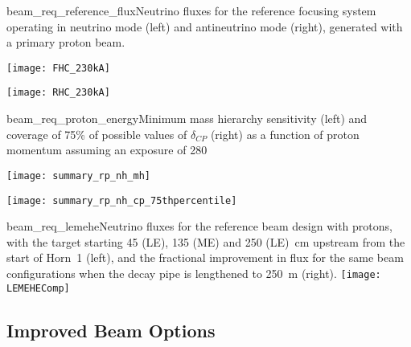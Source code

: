 \begin{cdrfigure}{beam_req_reference_flux}{Neutrino fluxes for the reference 
    focusing system operating in neutrino mode (left) and antineutrino 
    mode (right), generated with a  %
    primary proton beam.} 
\centering 
\begin{minipage}{0.45\textwidth}
\centering 
\texttt{[image: FHC\_230kA]}
\end{minipage}\hfill 
\begin{minipage}{0.45\textwidth}
\centering 
\texttt{[image: RHC\_230kA]}
\end{minipage}
\end{cdrfigure}

\begin{cdrfigure}{beam_req_proton_energy}{Minimum mass hierarchy
    sensitivity (left) and 
    coverage of 75\% of possible values of $\delta_{CP}$ (right) as a
    function of proton momentum assuming an exposure of \num{280}~\ktyr}
\centering 
\begin{minipage}{0.45\textwidth}
\centering 
\texttt{[image: summary\_rp\_nh\_mh]}
\end{minipage}\hfill 
\begin{minipage}{0.45\textwidth}
\centering 
\texttt{[image: summary\_rp\_nh\_cp\_75thpercentile]}
\end{minipage}
\end{cdrfigure}

\begin{cdrfigure} {beam_req_lemehe}{Neutrino fluxes for the 
    reference beam design with  protons, with the target starting 45 (LE), 135 (ME) 
    and 250 (LE)~cm upstream from the start of Horn~1 (left), and the 
   fractional improvement in flux for the same beam configurations 
    when the decay pipe is lengthened to 250~m (right).}
    \texttt{[image: LEMEHEComp]}
  \end{cdrfigure}
 
\subsection{Improved Beam Options}
\label{sec:alternative-focusing-systems}

